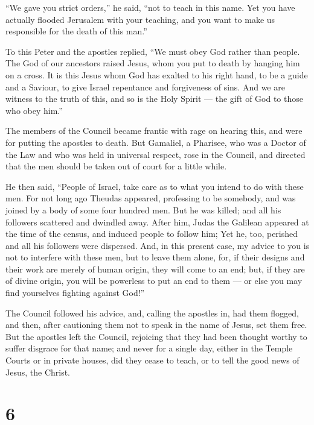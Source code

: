  ``We gave you strict orders,'' he said, ``not to teach in
this name. Yet you have actually flooded Jerusalem with your teaching,
and you want to make us responsible for the death of this man.''

 To this Peter and the apostles replied, ``We must obey God
rather than people.  The God of our ancestors raised Jesus,
whom you put to death by hanging him on a cross.  It is
this Jesus whom God has exalted to his right hand, to be a guide and a
Saviour, to give Israel repentance and forgiveness of sins.
 And we are witness to the truth of this, and so is the
Holy Spirit --- the gift of God to those who obey him.''

 The members of the Council became frantic with rage on
hearing this, and were for putting the apostles to death. 
But Gamaliel, a Pharisee, who was a Doctor of the Law and who was held
in universal respect, rose in the Council, and directed that the men
should be taken out of court for a little while.

 He then said, ``People of Israel, take care as to what you
intend to do with these men.  For not long ago Theudas
appeared, professing to be somebody, and was joined by a body of some
four hundred men. But he was killed; and all his followers scattered and
dwindled away.  After him, Judas the Galilean appeared at
the time of the census, and induced people to follow him; Yet he, too,
perished and all his followers were dispersed.  And, in
this present case, my advice to you is not to interfere with these men,
but to leave them alone, for, if their designs and their work are merely
of human origin, they will come to an end;  but, if they
are of divine origin, you will be powerless to put an end to them --- or
else you may find yourselves fighting against God!''

 The Council followed his advice, and, calling the apostles
in, had them flogged, and then, after cautioning them not to speak in
the name of Jesus, set them free.  But the apostles left
the Council, rejoicing that they had been thought worthy to suffer
disgrace for that name;  and never for a single day, either
in the Temple Courts or in private houses, did they cease to teach, or
to tell the good news of Jesus, the Christ.

\hypertarget{section-5}{%
\section{6}\label{section-5}}

